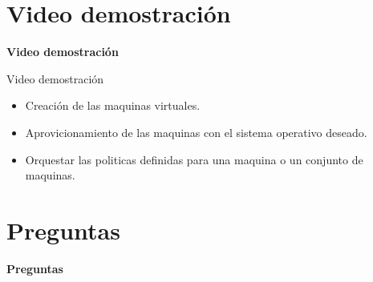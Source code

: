 \section{Video demostración}
\begin{frame}
    \Huge
    \centering
    \textbf{Video demostración}

\end{frame}

\begin{frame}{Video demostración}
    \vspace{-1.5cm}
    \begin{itemize}
        \item Creación de las maquinas virtuales.
        \item Aprovicionamiento de las maquinas con el sistema operativo deseado. 
        \item Orquestar las politicas definidas para una maquina o un conjunto de maquinas.
    \end{itemize}

\end{frame}


\section{Preguntas}
\begin{frame}
    \Huge
    \centering
    \textbf{Preguntas}

\end{frame}
